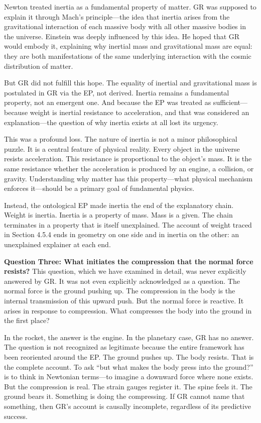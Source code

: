 \documentclass[11pt]{article}
\begin{document}
Newton treated inertia as a fundamental property of matter. GR was supposed to explain it through Mach's principle---the idea that inertia arises from the gravitational interaction of each massive body with all other massive bodies in the universe. Einstein was deeply influenced by this idea. He hoped that GR would embody it, explaining why inertial mass and gravitational mass are equal: they are both manifestations of the same underlying interaction with the cosmic distribution of matter.

But GR did not fulfill this hope. The equality of inertial and gravitational mass is postulated in GR via the EP, not derived. Inertia remains a fundamental property, not an emergent one. And because the EP was treated as sufficient---because weight is inertial resistance to acceleration, and that was considered an explanation---the question of why inertia exists at all lost its urgency.

This was a profound loss. The nature of inertia is not a minor philosophical puzzle. It is a central feature of physical reality. Every object in the universe resists acceleration. This resistance is proportional to the object's mass. It is the same resistance whether the acceleration is produced by an engine, a collision, or gravity. Understanding why matter has this property---what physical mechanism enforces it---should be a primary goal of fundamental physics.

Instead, the ontological EP made inertia the end of the explanatory chain. Weight is inertia. Inertia is a property of mass. Mass is a given. The chain terminates in a property that is itself unexplained. The account of weight traced in Section 4.5.4 ends in geometry on one side and in inertia on the other: an unexplained explainer at each end.

\textbf{Question Three: What initiates the compression that the normal force resists?} This question, which we have examined in detail, was never explicitly answered by GR. It was not even explicitly acknowledged as a question. The normal force is the ground pushing up. The compression in the body is the internal transmission of this upward push. But the normal force is reactive. It arises in response to compression. What compresses the body into the ground in the first place?

In the rocket, the answer is the engine. In the planetary case, GR has no answer. The question is not recognized as legitimate because the entire framework has been reoriented around the EP. The ground pushes up. The body resists. That is the complete account. To ask ``but what makes the body press into the ground?'' is to think in Newtonian terms---to imagine a downward force where none exists. But the compression is real. The strain gauges register it. The spine feels it. The ground bears it. Something is doing the compressing. If GR cannot name that something, then GR's account is causally incomplete, regardless of its predictive success.
\end{document}
